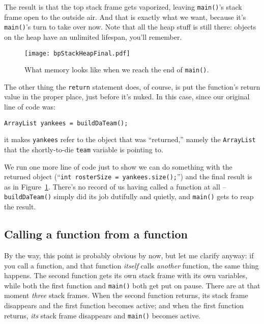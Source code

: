 The result is that the top stack frame gets vaporized, leaving
\texttt{main()}'s stack frame open to the outside air. And that is exactly
what we want, because it's \texttt{main()}'s turn to take over now. Note that
all the heap stuff is still there: objects on the heap have an unlimited
lifespan, you'll remember.

\begin{figure}[ht]   %
\centering
\texttt{[image: bpStackHeapFinal.pdf]}
\caption{What memory looks like when we reach the end of \texttt{main()}.}
\label{fig:bpStackHeapFinal}
\end{figure}

The other thing the \texttt{return} statement does, of course, is put the
function's return value in the proper place, just before it's nuked. In this
case, since our original line of code was:

\begin{Verbatim}[fontsize=\small,samepage=true]
        ArrayList yankees = buildDaTeam();
\end{Verbatim}

it makes \texttt{yankees} refer to the object that was ``returned,'' namely the
\texttt{ArrayList} that the shortly-to-die \texttt{team} variable is pointing
to.

We run one more line of code just to show we can do something with the
returned object (``\texttt{int rosterSize = yankees.size();}'') and the final
result is as in Figure~\ref{fig:bpStackHeapFinal}. There's no record of us
having called a function at all -- \texttt{buildDaTeam()} simply did its job
dutifully and quietly, and \texttt{main()} gets to reap the result.

\subsection{Calling a function from a function}

By the way, this point is probably obvious by now, but let me clarify anyway:
if you call a function, and that function \textit{itself} calls
\textit{another} function, the same thing happens. The second function gets
its own stack frame with its own variables, while both the first function and
\texttt{main()} both get put on pause. There are at that moment \textit{three}
stack frames. When the second function returns, its stack frame disappears and
the first function becomes active; and when the first function returns,
\textit{its} stack frame disappears and \texttt{main()} becomes active.

